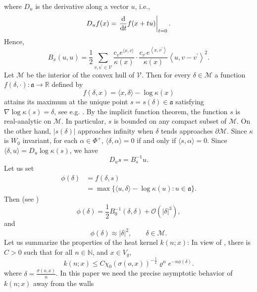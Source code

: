 \documentclass[11pt]{amsart}
\newcommand{\NN}{\mathbb{N}}
\newcommand{\calO}{\mathcal{O}}
\newcommand{\calM}{\mathcal{M}}
\newcommand{\norm}[1]{\lvert {#1} \rvert}
\newcommand{\abs}[1]{\lvert {#1} \rvert}
\newcommand{\sprod}[2]{\langle {#1}, {#2} \rangle}
\theoremstyle{plain}
\theoremstyle{definition}
\numberwithin{equation}{section}
\begin{document}
where $D_u$ is the derivative along a vector $u$, i.e.,
\[
	D_u f(x)=\left.\frac{\mathrm{d}}{{\rm d} t} f(x+t u)\right|_{t=0}.
\]
Hence,
\[
	B_x(u, u)=\frac{1}{2} \sum_{v, v^{\prime} \in \mathcal{V}} 
	\frac{c_v e^{\langle x, v\rangle}}{\kappa(x)} \cdot \frac{c_{v^{\prime}} 
	e^{\left\langle x, v^{\prime}\right\rangle}}{\kappa(x)}\left\langle u, v-v^{\prime}\right\rangle^2.
\]
Let $\mathcal{M}$ be the interior of the convex hull of $\mathcal{V}$. Then for every $\delta \in \mathcal{M}$ 
a function $f(\delta, \cdot): \mathfrak{a} \rightarrow \mathbb{R}$ defined by
\[
	f(\delta, x)=\langle x, \delta\rangle-\log \kappa(x)
\]
attains its maximum at the unique point $s = s(\delta) \in \mathfrak{a}$ satisfying $\nabla \log \kappa(s)=\delta$,
see e.g. \cite[Theorem 2.1]{tr}. By the implicit function theorem, the function $s$ is real-analytic on 
$\mathcal{M}$. In particular, $s$ is bounded on any compact subset of $\mathcal{M}$. On the other hand, $|s(\delta)|$ approaches 
infinity when $\delta$ tends approaches $\partial\mathcal{M}$. Since $\kappa$ is $W_0$ invariant, for each $\alpha \in \Phi^+$,
$\sprod{\delta}{\alpha} = 0$ if and only if $\sprod{s}{\alpha} = 0$. Since $\sprod{\delta}{u} = D_u \log \kappa(s)$, we 
have
\[
	D_u s = B_s^{-1} u.
\]
Let us set
\begin{equation}
	\label{eq:20}
	\begin{aligned}
	\phi(\delta)
	&=
	f(\delta, s) \\
	&=
	\max\big\{\sprod{u}{\delta} - \log \kappa(u) : u \in \mathfrak{a} \big\}.
	\end{aligned}
\end{equation}
Then (see \cite[Section 2.1]{tr})
\begin{equation}
	\label{eq:33a}
	\phi(\delta) = \frac{1}{2} B_0^{-1}(\delta, \delta) + \calO(\abs{\delta}^3),
\end{equation}
and
\begin{equation}
	\label{eq:33b}
	\phi(\delta) \approx \norm{\delta}^2, \qquad \delta \in \calM.
\end{equation}
Let us summarize the properties of the heat kernel $k(n; x)$: In view of \cite[Remark 2]{tr}, there is $C > 0$
such that for all $n \in \NN$, and $x \in V_g$,
\begin{equation}
	\label{eq:3}
	k(n; x) \leqslant C \chi_0(\sigma(o, x) )^{-\frac{1}{2}} \varrho^n e^{-n \phi(\delta)}.
\end{equation}
where $\delta = \frac{\sigma(o, x)}{n}$. In this paper we need the precise asymptotic behavior of $k(n; x)$ away from the walls
\end{document}
